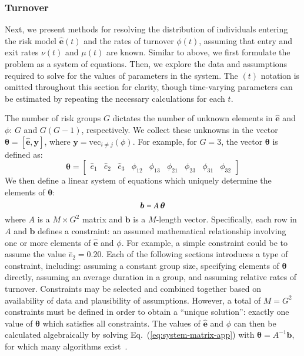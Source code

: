 \subsubsection{Turnover}
\label{aaa:params-turnover}
Next, we present methods for resolving
the distribution of individuals entering the risk model $\bm{\hat{e}}(t)$ and
the rates of turnover $\phi(t)$,
assuming that entry and exit rates $\nu(t)$ and $\mu(t)$ are known.
Similar to above, we first formulate the problem as a system of equations.
Then, we explore the data and assumptions required
to solve for the values of parameters in the system.
The $(t)$ notation is omitted throughout this section for clarity,
though time-varying parameters can be estimated by
repeating the necessary calculations for each $t$.
\par
The number of risk groups $G$ dictates the number of
unknown elements in $\bm{\hat{e}}$ and $\phi$: $G$ and $G(G-1)$, respectively.
We collect these unknowns in the vector
$\bm{\theta} = \left[\bm{\hat{e}}, \bm{y}\right]$,
where $\bm{y} = \mathrm{vec}_{i \ne j}(\phi)$.
For example, for $G = 3$, the vector $\bm{\theta}$ is defined as:
\begin{equation}
\bm{\theta} = \left[
\begin{array}{ccccccccc}
\hat{e}_1 & \hat{e}_2 & \hat{e}_3 & \phi_{12} & \phi_{13} & \phi_{21} & \phi_{23} & \phi_{31} & \phi_{32}
\end{array}\right]
\end{equation}
We then define a linear system of equations
which uniquely determine the elements of $\bm{\theta}$:
\begin{equation}\label{eq:system-matrix-app}
\bm{b} = A \thinspace \bm{\theta}
\end{equation}
where $A$ is a $M \times G^2$ matrix
and $\bm{b}$ is a $M$-length vector.
Specifically, each row in $A$ and $\bm{b}$ defines a constraint:
an assumed mathematical relationship involving one or more elements of
$\bm{\hat{e}}$ and $\phi$.
For example, a simple constraint could be to assume the value $\hat{e}_2 = 0.20$.
Each of the following sections introduces a type of constraint, including:
assuming a constant group size,
specifying elements of $\bm{\theta}$ directly,
assuming an average duration in a group,
and assuming relative rates of turnover.
Constraints may be selected and combined together based on
availability of data and plausibility of assumptions.
However, a total of $M = G^2$ constraints must be defined
in order to obtain a ``unique solution'':
exactly one value of $\bm{\theta}$ which satisfies all constraints.
The values of $\bm{\hat{e}}$ and $\phi$
can then be calculated algebraically by solving Eq.~(\ref{eq:system-matrix-app})
with $\bm{\theta} = A^{-1}\bm{b}$,
for which many algorithms exist~\citep{LAPACK}.
